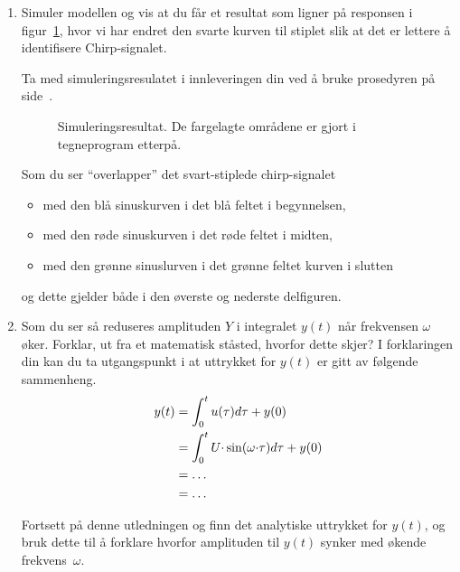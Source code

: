   \begin{enumerate}[label=p\arabic*)]
    \item Simuler modellen og vis at du får et resultat som ligner på 
responsen i figur~\ref{fig:dump_2p}, hvor 
vi har endret den svarte kurven til stiplet slik at
det er lettere å identifisere {\sf Chirp}-signalet.

Ta med simuleringsresulatet
i innleveringen din
ved å bruke prosedyren på
     side~\pageref{page:prosedyre}.

  \begin{figure}[H]
    \centering
    \hspace*{0mm}
    \caption{Simuleringsresultat. De fargelagte områdene er gjort i
      tegneprogram etterpå. }
    \label{fig:dump_2p}
  \end{figure}

 Som du ser
``overlapper'' det svart-stiplede chirp-signalet
\begin{itemize}
\item med den blå sinuskurven i det blå feltet i begynnelsen,  
\item med den røde sinuskurven i det røde feltet i midten,  
\item med den grønne sinuslurven i det grønne feltet kurven i slutten  
\end{itemize}
og dette gjelder både i den øverste og nederste delfiguren.


\item Som du ser så reduseres amplituden $Y$ i integralet $y(t)$ når
  frekvensen $\omega$ øker.   
  Forklar, ut fra et matematisk ståsted, hvorfor dette skjer? I
  forklaringen din kan du ta
  utgangspunkt i at uttrykket for $y(t)$ er gitt av
  følgende sammenheng.
\begin{align}
  y(t) & = \int_{0}^{t} u(\tau)  d\tau + y(0)  \notag \\
       & = \int_{0}^{t} U{\cdot}\sin(\omega{\cdot}\tau) d\tau  +y(0) \notag   \\
  & = \ldots \notag   \\
  & = \ldots \notag   
\end{align}

Fortsett på denne utledningen og finn det analytiske uttrykket for
$y(t)$, og bruk dette til å forklare hvorfor amplituden til $y(t)$ synker med
økende frekvens~$\omega$. 
  
\end{enumerate}




 

